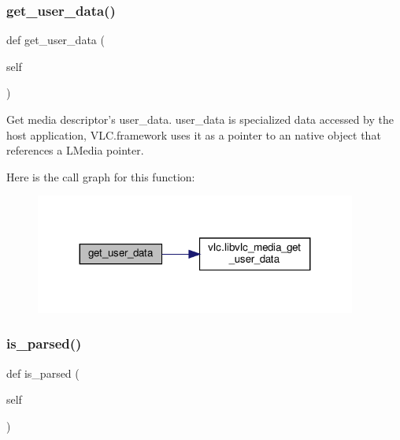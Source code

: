 \subsubsection{\texorpdfstring{get\+\_\+user\+\_\+data()}{get\_user\_data()}}
{\footnotesize\ttfamily def get\+\_\+user\+\_\+data (\begin{DoxyParamCaption}\item[{}]{self }\end{DoxyParamCaption})}

\begin{DoxyVerb}Get media descriptor's user_data. user_data is specialized data
accessed by the host application, VLC.framework uses it as a pointer to
an native object that references a L{Media} pointer.
\end{DoxyVerb}
 Here is the call graph for this function\+:
\nopagebreak
\begin{figure}[H]
\begin{center}
\leavevmode
\includegraphics[width=299pt]{classvlc_1_1_media_a46e189dfe465a3463ea9a0fba87bf237_cgraph}
\end{center}
\end{figure}
\mbox{\label{classvlc_1_1_media_a94c3d6b6dcae451a9239a3ce8662e9d4}} 
\subsubsection{\texorpdfstring{is\+\_\+parsed()}{is\_parsed()}}
{\footnotesize\ttfamily def is\+\_\+parsed (\begin{DoxyParamCaption}\item[{}]{self }\end{DoxyParamCaption})}

